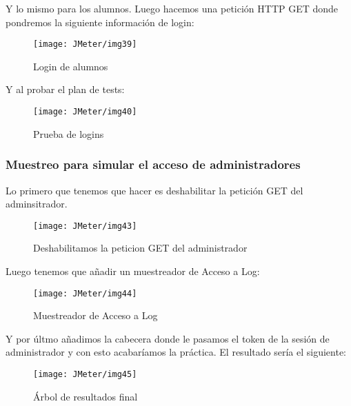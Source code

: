 Y lo mismo para los alumnos. Luego hacemos una petición HTTP GET donde pondremos la siguiente información de login:

\begin{figure}[H]
    \centering
    \texttt{[image: JMeter/img39]}
    \caption{Login de alumnos}
\end{figure}

Y al probar el plan de tests:

\begin{figure}[H]
    \centering
    \texttt{[image: JMeter/img40]}
    \caption{Prueba de logins}
\end{figure}

\subsubsection{Muestreo para simular el acceso de administradores}
Lo primero que tenemos que hacer es deshabilitar la petición GET del adminsitrador.

\begin{figure}[H]
    \centering
    \texttt{[image: JMeter/img43]}
    \caption{Deshabilitamos la peticion GET del administrador}
\end{figure}

Luego tenemos que añadir un muestreador de Acceso a Log:

\begin{figure}[H]
    \centering
    \texttt{[image: JMeter/img44]}
    \caption{Muestreador de Acceso a Log}
\end{figure}

Y por últmo añadimos la cabecera donde le pasamos el token de la sesión de administrador y con esto acabaríamos la práctica.
El resultado sería el siguiente:

\begin{figure}[H]
    \centering
    \texttt{[image: JMeter/img45]}
    \caption{Árbol de resultados final}
\end{figure}





